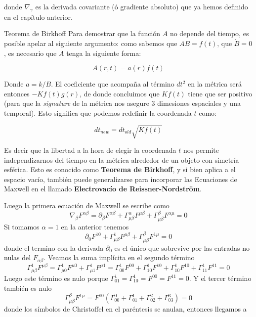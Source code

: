 donde $\nabla_\gamma$ es la derivada covariante (ó gradiente absoluto) que ya hemos definido en el capítulo anterior.

\begin{marginfigure}
\begin{remarkbox}{Teorema de Birkhoff}
Para demostrar que la función $A$ no depende del tiempo, es posible apelar al siguiente argumento: como sabemos que $AB=f(t)$,  que $\dot{B}=0$, es necesario que $A$ tenga la siguiente forma:

$$A(r,t)=a(r)f(t)$$

Donde $a=k/B$. El coeficiente que acompaña al término $dt^2$ en la métrica será entonces $-Kf(t)g(r)$, de donde concluimos que $Kf(t)$ tiene que ser positivo (para que la \textit{signature} de la métrica nos asegure 3 dimesiones espaciales y una temporal). Esto significa que podemos redefinir la coordenada $t$ como:

\begin{equation}
    dt_{new}=dt_{old}\sqrt{Kf(t)}
\end{equation}

Es decir que la libertad a la hora de elegir la coordenada $t$ nos permite independizarnos del tiempo en la métrica alrededor de un objeto con simetría esférica. Esto es conocido como \textbf{Teorema de Birkhoff}, y si bien aplica a el espacio vacío, también puede generalizarse para incorporar las Ecuaciones de Maxwell en el llamado \textbf{Electrovacío de Reissner-Nordström}.
\end{remarkbox}
\end{marginfigure}


Luego la primera ecuación de Maxwell se escribe como
\begin{equation}
\nabla_\beta F^{\alpha\beta} = \partial_\beta F^{\alpha\beta} + \Gamma^\alpha_{\mu\beta}F^{\mu\beta} + \Gamma^\beta_{\mu\beta}F^{\alpha\mu} = 0 
\end{equation}
Si tomamos $\alpha=1$ en la anterior tenemos 
\begin{equation}
\partial_0 F^{10} + \Gamma^1_{\mu\beta}F^{\mu\beta} + \Gamma^\beta_{\mu\beta}F^{1\mu} = 0
\end{equation}
donde el termino con la derivada $\partial_0$ es el único que sobrevive por las entradas no nulas del $F_{\alpha\beta}$. Veamos la suma implícita en el segundo término
\begin{equation}
\Gamma^1_{\mu\beta}F^{\mu\beta} = \Gamma^1_{\mu0}F^{\mu0} +\Gamma^1_{\mu1}F^{\mu1}= \Gamma^1_{00}F^{00} + \Gamma^1_{10}F^{10} + \Gamma^1_{10}F^{10} + \Gamma^1_{11}F^{11}=0
\end{equation}
Luego este término es nulo porque $\Gamma^1_{01}=\Gamma^1_{10}=F^{00}=F^{11}=0$. Y el tercer término también es nulo 
\begin{equation}
\Gamma^\beta_{\mu\beta}F^{1\mu} = F^{10}(\Gamma^0_{00}+\Gamma^1_{01}+\Gamma^2_{02}+\Gamma^3_{03})=0
\end{equation}
donde los símbolos de Christoffel en el paréntesis se anulan, entonces llegamos a 


